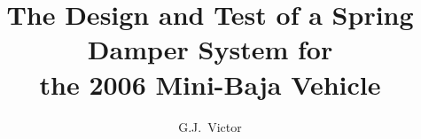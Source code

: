 \documentclass[14pt,afrikaans,english]{memoir}
\title{The Design and Test of a Spring Damper System for \\
       the 2006 Mini-Baja Vehicle}
\author{G.J.\ Victor}
       {Gabri\"el Johannes Victor\\
           14273861}
\begin{document}
\frontmatter
\TitlePage
\end{document}
